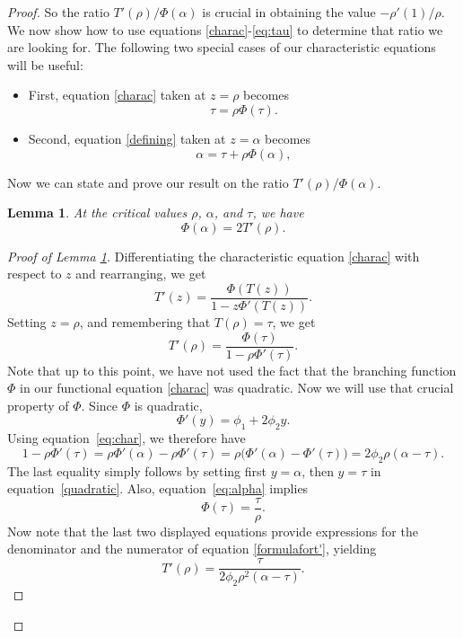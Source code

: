 \documentclass[10pt,a4paper]{amsart}
\newtheorem{lemma}[theorem]{Lemma}
\theoremstyle{remark}
\begin{document}
\begin{proof}
So the ratio $T'(\rho)/\Phi(\alpha)$ is crucial in obtaining the value $-\rho'(1)/\rho$.  We now show how to use equations \eqref{charac}-\eqref{eq:tau} to determine that ratio we are looking for.  The following two special cases of our characteristic equations will be useful:
\begin{itemize}
\item
First, equation \eqref{charac} taken at $z=\rho$ becomes
\begin{equation}
\label{eq:alpha}
	\tau=\rho\Phi(\tau).
\end{equation}
\item
Second, equation \eqref{defining} taken at $z=\alpha$ becomes
\begin{equation}
\label{eq:tau}
	\alpha=\tau+\rho\Phi(\alpha),
\end{equation}
\end{itemize}
Now we can state and prove our result on the ratio $T'(\rho)/\Phi(\alpha)$.

\begin{lemma}\label{lem:phiandt}
At the critical values \(\rho\), \(\alpha\), and \(\tau\), we have
\begin{equation} \label{phiandt}
\Phi(\alpha)=2T'(\rho).
\end{equation}
\end{lemma}

\begin{proof}[Proof of Lemma \ref{lem:phiandt}]
Differentiating the characteristic equation \eqref{charac}
with respect to $z$ and rearranging, we get
\[
T'(z)=
\frac{\Phi(T(z))}
{1-z\Phi'(T(z))}.
\]
Setting $z=\rho$, and remembering that $T(\rho)=\tau$, we get
\begin{equation} \label{formulafort'}
T'(\rho)=
\frac{\Phi(\tau)}
{1-\rho\Phi'(\tau)}.
\end{equation}
Note that up to this point, we have not used the fact that the branching function $\Phi$  in our functional equation \eqref{charac} was quadratic. Now we will use that crucial property of $\Phi$.
Since \(\Phi\) is quadratic,
\begin{equation} \label{quadratic}
\Phi'(y)=\phi_1+2\phi_2y.
\end{equation}
Using equation~\eqref{eq:char}, we therefore have
\[
1-\rho\Phi'(\tau)
=\rho\Phi'(\alpha) - \rho \Phi'(\tau)=
\rho\bigl(\Phi'(\alpha)-\Phi'(\tau)\bigr)
=
2\phi_2\rho(\alpha-\tau).
\] The last equality simply follows by setting first $y=\alpha$, then $y=\tau$ in equation~\eqref{quadratic}.
Also, equation~\eqref{eq:alpha} implies
\[
\Phi(\tau)=\frac{\tau}{\rho}.
\]
Now note that the last two displayed equations provide expressions for the denominator and the numerator of equation \eqref{formulafort'},
yielding
\begin{equation}
T'(\rho)
=
\frac{\tau}
{2\phi_2\rho^2(\alpha-\tau)}.
\label{eq:Tprime}
\end{equation}


\end{proof}
\end{proof}
\end{document}
